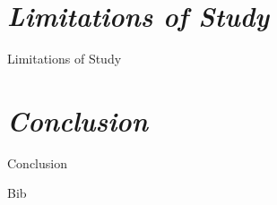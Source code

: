 \documentclass[12pt, a4paper]{report}
\begin{document}
        
        
        
        
        
        
        
        
        
        
        
        
        
        
\chapter{\textit{Limitations of Study}}
        
        {Limitations of Study}
        
        
        
\chapter{\textit{Conclusion}}
        
        {Conclusion}
        

        
\clearpage

{Bib}


\clearpage


\end{document}
